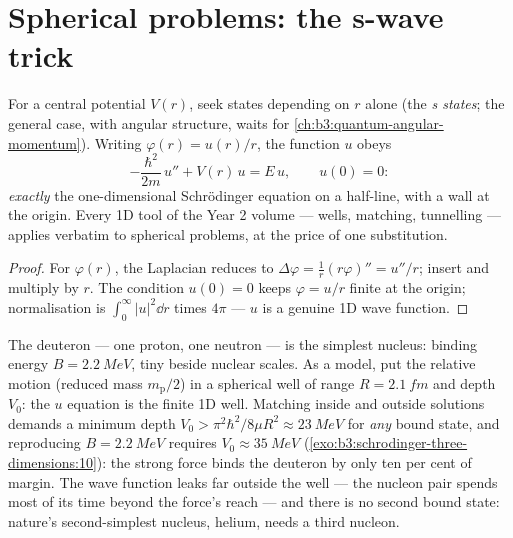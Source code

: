 \section{Spherical problems: the s-wave trick}

\begin{proposition}\label{prop:b3:schrodinger-three-dimensions:swave}
For a central potential $V(r)$, seek states depending on $r$ alone
(the \emph{s states}; the general case, with angular structure,
waits for \cref{ch:b3:quantum-angular-momentum}). Writing
$\varphi(r) = u(r)/r$, the function $u$ obeys
\[
-\frac{\hbar^2}{2m}\,u'' + V(r)\,u = E\,u ,
\qquad u(0) = 0 :
\]
\emph{exactly} the one-dimensional Schrödinger equation on a
half-line, with a wall at the origin. Every 1D tool of the Year 2
volume --- wells, matching, tunnelling --- applies verbatim to
spherical problems, at the price of one substitution.
\end{proposition}

\begin{proof}
For $\varphi(r)$, the Laplacian reduces to $\Delta\varphi =
\tfrac1r(r\varphi)'' = u''/r$; insert and multiply by $r$. The
condition $u(0) = 0$ keeps $\varphi = u/r$ finite at the origin;
normalisation is $\int_0^\infty|u|^2\dd r$ times $4\pi$ --- $u$ is a
genuine 1D wave function.
\end{proof}

\begin{example}\label{ex:b3:schrodinger-three-dimensions:deuteron}
The deuteron --- one proton, one neutron --- is the simplest nucleus:
binding energy $B = \qty{2.2}{MeV}$, tiny beside nuclear scales. As
a model, put the relative motion (reduced mass $m_{\text{p}}/2$) in
a spherical well of range $R = \qty{2.1}{fm}$ and depth $V_0$: the
$u$ equation is the finite 1D well. Matching inside and outside
solutions demands a minimum depth $V_0 > \pi^2\hbar^2/8\mu R^2
\approx \qty{23}{MeV}$ for \emph{any} bound state, and reproducing
$B = \qty{2.2}{MeV}$ requires $V_0 \approx \qty{35}{MeV}$
(\cref{exo:b3:schrodinger-three-dimensions:10}): the strong force
binds the deuteron by only ten per cent of margin. The wave function
leaks far outside the well --- the nucleon pair spends most of its
time beyond the force's reach --- and there is no second bound
state: nature's second-simplest nucleus, helium, needs a third
nucleon.
\end{example}

